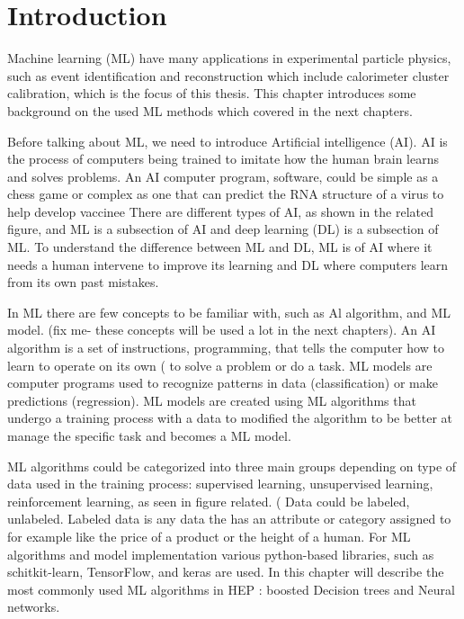 \section{Introduction}
Machine learning (ML) have many applications in experimental particle physics, such as event identification and reconstruction which include calorimeter cluster calibration, which is the focus of this thesis. This chapter introduces some background on the used ML methods which covered in the next chapters. %

Before talking about ML, we need to introduce Artificial intelligence (AI). AI is the process of computers being trained to imitate how the human brain learns and solves problems. An AI computer program, software, could be simple as a chess game or complex as one that can predict the RNA structure of a virus to help develop vaccinee %
There are different types of AI, as shown in the related figure, and ML is a subsection of AI and deep learning (DL) is a subsection of ML. To understand the difference between ML and DL, ML is of AI where it needs a human intervene to improve its learning and DL where computers learn from its own past mistakes. %

In ML there are few concepts to be familiar with, such as Al algorithm, and ML model. (fix me- these concepts will be used a lot in the next chapters). An AI algorithm is a set of instructions, programming, that tells the computer how to learn to operate on its own (%
to solve a problem or do a task. ML models are computer programs used to recognize patterns in data (classification) or make predictions (regression). ML models are created using ML algorithms that undergo a training process with a data to modified the algorithm to be better at manage the specific task and becomes a ML model. %

ML algorithms could be categorized into three main groups depending on type of data used in the training process: supervised learning, unsupervised learning, reinforcement learning, as seen in figure related. (%
Data could be labeled, unlabeled. Labeled data is any data the has an attribute or category assigned to for example like the price of a product or the height of a human. For ML algorithms and model implementation various python-based libraries, such as schitkit-learn, TensorFlow, and keras are used. In this chapter will describe the most commonly used ML algorithms in HEP %
: boosted Decision trees and Neural networks.


